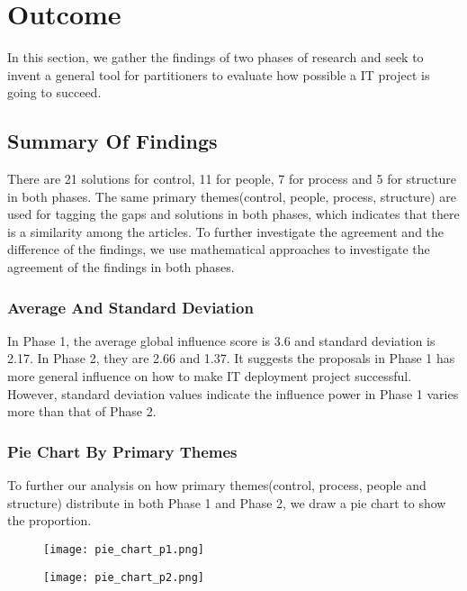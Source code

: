 
\section{Outcome}
In this section, we gather the findings of two phases of research and seek to invent a general tool for partitioners to evaluate how possible a IT project is going to succeed.

\subsection{Summary Of Findings}
There are 21 solutions for control, 11 for people, 7 for process and 5 for structure in both phases. The same primary themes(control, people, process, structure) are used for tagging the gaps and solutions in both phases, which indicates that there is a similarity among the articles. To further investigate the agreement and the difference of the findings, we use mathematical approaches to investigate the agreement of the findings in both phases.

\subsubsection{Average And Standard Deviation}
In Phase 1, the average global influence score is 3.6 and standard deviation
is 2.17. In Phase 2, they are 2.66 and 1.37. It suggests the proposals in Phase 1 has more general influence on how to make IT deployment project successful. However, standard deviation values indicate the influence power in Phase 1 varies more than that of Phase 2.
\subsubsection{Pie Chart By Primary Themes}
To further our analysis on how primary themes(control, process, people and structure) distribute in both Phase 1 and Phase 2, we draw a pie chart to show the proportion.

\begin{figure}[!ht]
\centering
\begin{minipage}{.5\textwidth}
  \centering
  \texttt{[image: pie\_chart\_p1.png]}
  \label{pie:1}
\end{minipage}%
\begin{minipage}{.5\textwidth}
  \centering
  \texttt{[image: pie\_chart\_p2.png]}
  \label{pie:2}
\end{minipage}
\end{figure}

